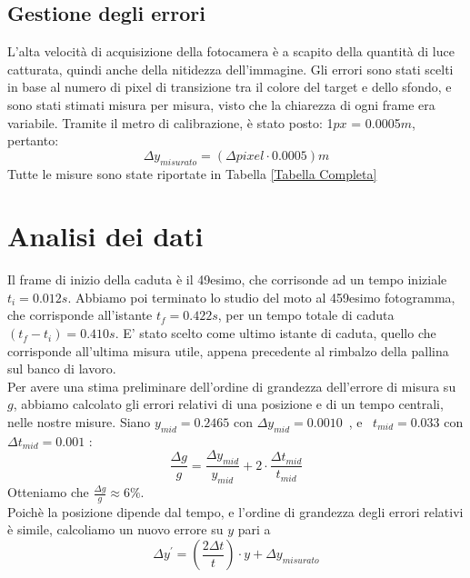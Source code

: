 \documentclass[12pt, a4paper]{article}
\begin{document}
\subsection{Gestione degli errori}
L'alta velocità di acquisizione della fotocamera è a scapito della quantità di luce catturata, quindi anche della nitidezza dell'immagine.
Gli errori sono stati scelti in base al numero di pixel di transizione tra il colore del target e dello sfondo, e sono stati stimati misura per misura, visto che la chiarezza di ogni frame era variabile. Tramite il metro di calibrazione, è stato posto: 1$px$ = 0.0005$m$, pertanto:
\begin{equation*}
    \Delta y_{misurato}= (\Delta pixel \cdot 0.0005)m
\end{equation*}
\bigskip
Tutte le misure sono state riportate in Tabella \ref{Tabella Completa}

\section{Analisi dei dati}
Il frame di inizio della caduta è il 49esimo, che corrisonde ad un tempo iniziale \textit{$t_i = 0.012s$}.
Abbiamo poi terminato lo studio del moto al 459esimo fotogramma, che corrisponde all'istante \textit{$t_f = 0.422s$}, per un tempo totale di caduta \textit{$(t_f-t_i) = 0.410s$}. 
E' stato scelto come ultimo istante di caduta, quello che corrisponde all'ultima misura utile, appena precedente al rimbalzo della pallina sul banco di lavoro.\\

Per avere una stima preliminare dell'ordine di grandezza dell'errore di misura su $g$, abbiamo calcolato gli errori relativi di una posizione e di un tempo centrali, nelle nostre misure. Siano $y_{mid}=0.2465$ con $\Delta y_{mid}=0.0010$\ , e \ $t_{mid}=0.033$ con $\Delta t_{mid}=0.001$ :
\begin{equation*}
    \frac{\Delta g}{g}=\frac{\Delta y_{mid}}{y_{mid}}+2\cdot \frac{\Delta t_{mid}}{t_{mid}}
\end{equation*}
Otteniamo che $\displaystyle\frac{\Delta g}{g}\approx 6\%$.\bigskip\\

Poichè la posizione dipende dal tempo, e l'ordine di grandezza degli errori relativi è simile, calcoliamo un nuovo errore su $y$ pari a 
\begin{equation*}
   \Delta y^{'} = \left(\frac{2\Delta t}{t}\right)\cdot y + \Delta y_{misurato}
\end{equation*}
\end{document}
